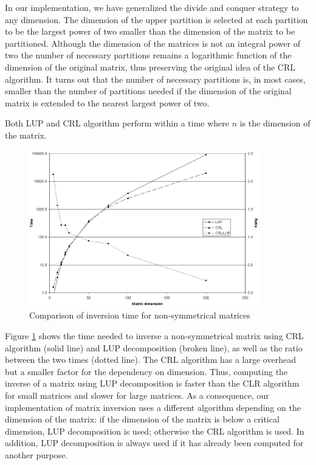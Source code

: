 \documentclass[twoside]{book}
\begin{document}
 In our implementation, we have
generalized the divide and conquer strategy to any dimension. The
dimension of the upper partition is selected at each partition to
be the largest power of two smaller than the dimension of the
matrix to be partitioned. Although the dimension of the matrices
is not an integral power of two the number of necessary partitions
remains a logarithmic function of the dimension of the original
matrix, thus preserving the original idea of the CRL algorithm. It
turns out that the number of necessary partitions is, in most
cases, smaller than the number of partitions needed if the
dimension of the original matrix is extended to the nearest
largest power of two.

Both LUP and CRL algorithm perform within a time  where
$n$ is the dimension of the matrix.
\begin{figure}
\centering\includegraphics[width=10cm]{Figures/InversionTime}
\caption{Comparison of inversion time for non-symmetrical
matrices}\label{fig:inversionTime}
\end{figure}
Figure \ref{fig:inversionTime} shows the time needed to inverse a
non-symmetrical matrix using CRL algorithm (solid line) and LUP
decomposition (broken line), as well as the ratio between the two
times (dotted line). The CRL algorithm has a large overhead but a
smaller factor for the dependency on dimension. Thus, computing
the inverse of a matrix using LUP decomposition is faster than the
CLR algorithm for small matrices and slower for large matrices. As
a consequence, our implementation of matrix inversion uses a
different algorithm depending on the dimension of the matrix: if
the dimension of the matrix is below a critical dimension, LUP
decomposition is used; otherwise the CRL algorithm is used. In
addition, LUP decomposition is always used if it has already been
computed for another purpose.
\end{document}
